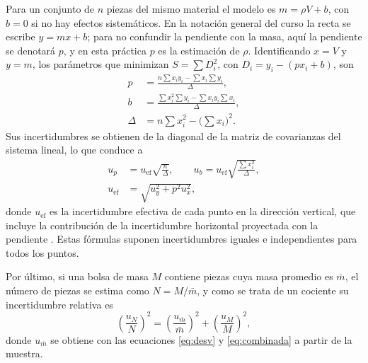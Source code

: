 Para un conjunto de $n$ piezas del mismo material el modelo es $m = \rho V + b$, con $b = 0$ si no hay efectos sistemáticos. En la notación general del curso la recta se escribe $y = mx + b$; para no confundir la pendiente con la masa, aquí la pendiente se denotará $p$, y en esta práctica $p$ es la estimación de $\rho$. Identificando $x = V$ y $y = m$, los parámetros que minimizan $S = \sum D_i^{2}$, con $D_i = y_i - (px_i + b)$, son \cite{baird}
\begin{align}
    p &= \frac{n\sum x_i y_i - \sum x_i \sum y_i}{\Delta}, \label{eq:mc}\\
    b &= \frac{\sum x_i^{2}\sum y_i - \sum x_i y_i \sum x_i}{\Delta}, \label{eq:mcb}\\
    \Delta &= n\sum x_i^{2} - \Big(\sum x_i\Big)^{2}. \label{eq:delta}
\end{align}
Sus incertidumbres se obtienen de la diagonal de la matriz de covarianzas del sistema lineal, lo que conduce a
\begin{align}
    u_p &= u_{\mathrm{ef}}\sqrt{\frac{n}{\Delta}}, \qquad
    u_b = u_{\mathrm{ef}}\sqrt{\frac{\sum x_i^{2}}{\Delta}}, \label{eq:mc_unc}\\
    u_{\mathrm{ef}} &= \sqrt{u_y^{2} + p^{2}u_x^{2}}, \label{eq:uef}
\end{align}
donde $u_{\mathrm{ef}}$ es la incertidumbre efectiva de cada punto en la dirección vertical, que incluye la contribución de la incertidumbre horizontal proyectada con la pendiente \cite{diapositivas}. Estas fórmulas suponen incertidumbres iguales e independientes para todos los puntos.

Por último, si una bolsa de masa $M$ contiene piezas cuya masa promedio es $\bar{m}$, el número de piezas se estima como $N = M/\bar{m}$, y como se trata de un cociente su incertidumbre relativa es
\begin{equation}
    \left(\frac{u_N}{N}\right)^{2} = \left(\frac{u_{\bar m}}{\bar m}\right)^{2} + \left(\frac{u_M}{M}\right)^{2},
    \label{eq:cacahuates}
\end{equation}
donde $u_{\bar m}$ se obtiene con las ecuaciones \eqref{eq:desv} y \eqref{eq:combinada} a partir de la muestra.
